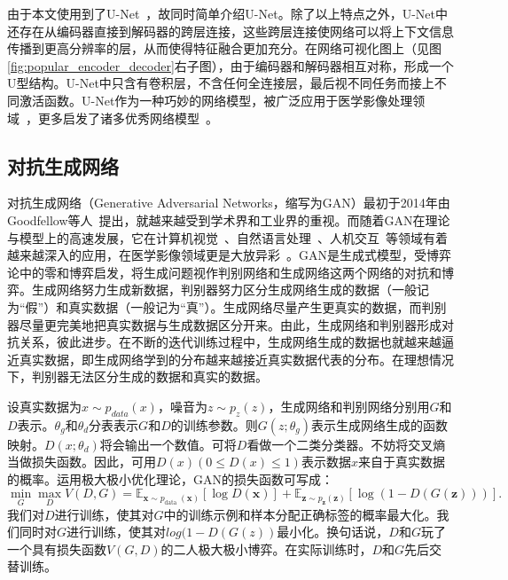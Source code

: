 由于本文使用到了U-Net~\cite{ronneberger2015u}，故同时简单介绍U-Net。除了以上特点之外，U-Net中还存在从编码器直接到解码器的跨层连接，这些跨层连接使网络可以将上下文信息传播到更高分辨率的层，从而使得特征融合更加充分。在网络可视化图上（见图\ref{fig:popular_encoder_decoder}右子图），由于编码器和解码器相互对称，形成一个U型结构。U-Net中只含有卷积层，不含任何全连接层，最后视不同任务而接上不同激活函数。U-Net作为一种巧妙的网络模型，被广泛应用于医学影像处理领域~\cite{cciccek20163d, han2018framing, dong2017automatic, sevastopolsky2017optic, zhang2018ct}，更多启发了诸多优秀网络模型~\cite{zhou2018unet++, oktay2018attention, ibtehaz2020multiresunet, alom2019recurrent, milletari2016v}。
\subsection{对抗生成网络}
对抗生成网络（Generative Adversarial Networks，缩写为GAN）最初于2014年由Goodfellow等人~\cite{goodfellow2014generative}提出，就越来越受到学术界和工业界的重视。而随着GAN在理论与模型上的高速发展，它在计算机视觉~\cite{zhu2017unpaired, isola2017image}、自然语言处理~\cite{qin2018dsgan, guimaraes2017objective}、人机交互~\cite{qiao2018emotional, sahu2018enhancing}等领域有着越来越深入的应用，在医学影像领域更是大放异彩~\cite{yang2017dagan, yang2018low, shin2018medical, onishi2020multiplanar, bhadra2020medical}。GAN是生成式模型，受博弈论中的零和博弈启发，将生成问题视作判别网络和生成网络这两个网络的对抗和博弈。生成网络努力生成新数据，判别器努力区分生成网络生成的数据（一般记为“假”）和真实数据（一般记为“真”）。生成网络尽量产生更真实的数据，而判别器尽量更完美地把真实数据与生成数据区分开来。由此，生成网络和判别器形成对抗关系，彼此进步。在不断的迭代训练过程中，生成网络生成的数据也就越来越逼近真实数据，即生成网络学到的分布越来越接近真实数据代表的分布。在理想情况下，判别器无法区分生成的数据和真实的数据。

设真实数据为$x\sim p_{data}(x)$，噪音为$z\sim p_z(z)$，生成网络和判别网络分别用$G$和$D$表示。$\theta_{g}$和$\theta_{d}$分表表示$G$和$D$的训练参数。则$G(z;\theta_{g})$表示生成网络生成的函数映射。$D(x;\theta_{d})$将会输出一个数值。可将$D$看做一个二类分类器。不妨将交叉熵当做损失函数。因此，可用$D(x)(0\leq D(x)\leq 1)$表示数据$x$来自于真实数据的概率。运用极大极小优化理论，GAN的损失函数可写成：
\begin{equation}\label{equ:gan_loss_func}
\min _{G} \max _{D} V(D, G)=\mathbb{E}_{\boldsymbol{x} \sim p_{\text {data }}(\boldsymbol{x})}[\log D(\boldsymbol{x})]+\mathbb{E}_{\boldsymbol{z} \sim p_{\boldsymbol{z}}(\boldsymbol{z})}[\log (1-D(G(\boldsymbol{z})))].
\end{equation}
我们对$D$进行训练，使其对$G$中的训练示例和样本分配正确标签的概率最大化。我们同时对$G$进行训练，使其对$log(1 - D(G(z))$最小化。换句话说，$D$和$G$玩了一个具有损失函数$V (G, D)$的二人极大极小博弈。在实际训练时，$D$和$G$先后交替训练。

